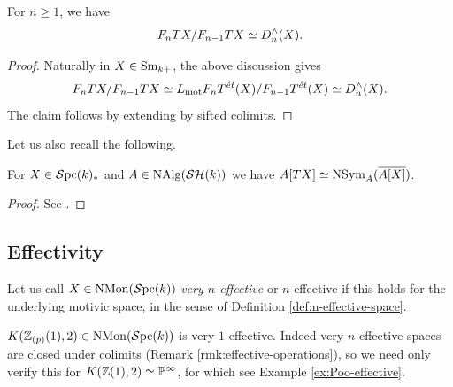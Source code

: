 \documentclass{amsart}
\numberwithin{proposition}{section}
\numberwithin{equation}{section}
\def\NSym{\mathrm{NSym}}
\def\NMon{\mathrm{NMon}}
\begin{document}
\begin{lemma} \label{lemm:T-filtration}
For $n \ge 1$, we have
\[
F_nTX/F_{n-1}TX \simeq D_n^\wedge(X).
\]
\end{lemma}
\begin{proof}
Naturally in $X \in {\mathrm{S}\mathrm{m}}_{k+}$, the above discussion gives \[ F_nTX/F_{n-1}TX \simeq L_{\mathrm{mot}} F_nT^{\acute{e}t}(X)/F_{n-1}T^{\acute{e}t}(X) \simeq D_n^\wedge(X). \]
The claim follows by extending by sifted colimits.
\end{proof}

Let us also recall the following.
\begin{lemma} \label{lemm:M-of-T}
For $X \in \mathcal{S}\mathrm{pc}{}(k)_*$ and $A \in \mathrm{NAlg}(\mathcal{SH}(k))$ we have $A[TX] \wequi \NSym_A(\overline{A[X]})$.
\end{lemma}
\begin{proof}
See \cite[Corollary 3.39]{bachmann-MGM}.
\end{proof}

\subsection{Effectivity}
Let us call $X \in \NMon(\Spc(k))$ \emph{very $n$-effective} or $n$-effective if this holds for the underlying motivic space, in the sense of Definition \ref{def:n-effective-space}.

\begin{example} \label{ex:K1-very-1-eff}
$K(\Z_{(p)}(1), 2) \in \NMon(\Spc(k))$ is very $1$-effective.
Indeed very $n$-effective spaces are closed under colimits (Remark \ref{rmk:effective-operations}), so we need only verify this for $K(\mathbb{Z}(1),2) \simeq \mathbb P^\infty$, for which see Example \ref{ex:Poo-effective}.
\end{example}
\end{document}
